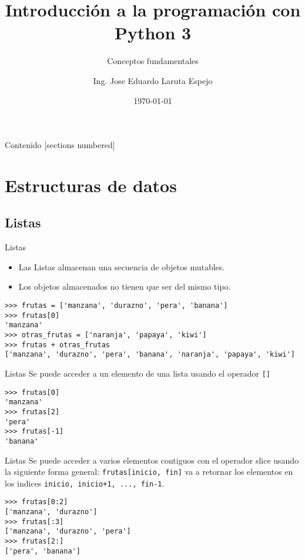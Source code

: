 \documentclass[10pt]{beamer}
\title{Introducción a la programación con Python 3}
\subtitle{Conceptos fundamentales}
\date{\today}
\author{Ing. Jose Eduardo Laruta Espejo}
\institute{Universidad La Salle}
\begin{document}
\maketitle

\begin{frame}[allowframebreaks]{Contenido}
  [sections numbered]
  \tableofcontents[]
\end{frame}


\section{Estructuras de datos}
\subsection{Listas}

\begin{frame}[fragile]{Listas}
    \begin{itemize}
        \item Las \alert{Listas} almacenan una secuencia de objetos mutables.
        \item Los objetos almacenados no tienen que ser del mismo tipo.
    \end{itemize}

\begin{lstlisting}
>>> frutas = ['manzana', 'durazno', 'pera', 'banana']
>>> frutas[0]
'manzana'
>>> otras_frutas = ['naranja', 'papaya', 'kiwi']
>>> frutas + otras_frutas
['manzana', 'durazno', 'pera', 'banana', 'naranja', 'papaya', 'kiwi']
\end{lstlisting}

\end{frame}

\begin{frame}[fragile]{Listas}
    Se puede acceder a un elemento de una lista usando el operador \texttt{[]}

\begin{lstlisting}
>>> frutas[0]
'manzana'
>>> frutas[2]
'pera'
>>> frutas[-1]
'banana'
\end{lstlisting}

\end{frame}

\begin{frame}[fragile]{Listas}
Se puede acceder a varios elementos contiguos con el operador slice
usando la siguiente forma general: \texttt{frutas[inicio, fin]} va a 
retornar los elementos en los indices \texttt{inicio, inicio+1, ..., fin-1}.

\begin{lstlisting}
>>> frutas[0:2]
['manzana', 'durazno']
>>> frutas[:3]
['manzana', 'durazno', 'pera']
>>> frutas[2:]
['pera', 'banana']
\end{lstlisting}

\end{frame}
\end{document}
